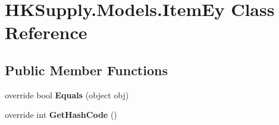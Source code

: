 \hypertarget{class_h_k_supply_1_1_models_1_1_item_ey}{}\section{H\+K\+Supply.\+Models.\+Item\+Ey Class Reference}
\label{class_h_k_supply_1_1_models_1_1_item_ey}
\subsection*{Public Member Functions}
\begin{DoxyCompactItemize}
\item 
\mbox{\label{class_h_k_supply_1_1_models_1_1_item_ey_aa196f85c6f7b19b2696cbc66a3772de5}} 
override bool {\bfseries Equals} (object obj)
\item 
\mbox{\label{class_h_k_supply_1_1_models_1_1_item_ey_a0ea5533e89491bdd07b77d77c9758c5e}} 
override int {\bfseries Get\+Hash\+Code} ()
\end{DoxyCompactItemize}

